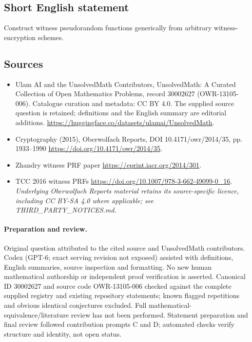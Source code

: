 \documentclass[11pt]{article}
\begin{document}
\subsection{Short English statement}
Construct witness pseudorandom functions generically from arbitrary witness-encryption schemes.
\subsection{Sources}
\begin{itemize}
\item[\hypertarget{source:30002627:1}{S1}] Ulam AI and the UnsolvedMath Contributors, UnsolvedMath: A Curated Collection of Open Mathematics Problems, record 30002627 (OWR-13105-006). Catalogue curation and metadata: CC BY 4.0. The supplied source question is retained; definitions and the English summary are editorial additions.
\url{https://huggingface.co/datasets/ulamai/UnsolvedMath}.
\item[\hypertarget{source:30002627:2}{S2}] Cryptography (2015), Oberwolfach Reports, DOI 10.4171/owr/2014/35, pp. 1933--1990
\url{https://doi.org/10.4171/owr/2014/35}.
\item[\hypertarget{source:30002627:3}{S3}] Zhandry witness PRF paper
\url{https://eprint.iacr.org/2014/301}.
\item[\hypertarget{source:30002627:4}{S4}] TCC 2016 witness PRFs
\url{https://doi.org/10.1007/978-3-662-49099-0_16}.
\textit{Underlying Oberwolfach Reports material retains its source-specific licence, including CC BY-SA 4.0 where applicable; see THIRD\_PARTY\_NOTICES.md.}
\end{itemize}
\paragraph{Preparation and review.}
Original question attributed to the cited source and UnsolvedMath contributors. Codex (GPT-6; exact serving revision not exposed) assisted with definitions, English summaries, source inspection and formatting. No new human mathematical authorship or independent proof verification is asserted. Canonical ID 30002627 and source code OWR-13105-006 checked against the complete supplied registry and existing repository statements; known flagged repetitions and obvious identical conjectures excluded. Full mathematical-equivalence/literature review has not been performed. Statement preparation and final review followed contribution prompts C and D; automated checks verify structure and identity, not open status.
\label{end:30002627}
\end{document}
